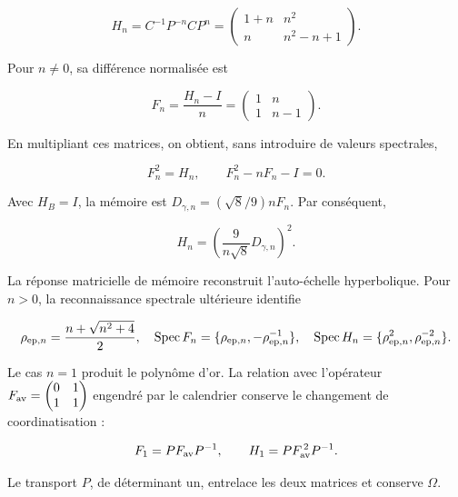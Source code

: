 \begin{equation}
H_n=C^{-1}P^{-n}CP^n
=\begin{pmatrix}1+n&n^2\\n&n^2-n+1\end{pmatrix}.
\label{md:antmem:matriz:eq:28}
\end{equation}

Pour \(n\ne0\), sa différence normalisée est

\[
F_n=\frac{H_n-I}{n}
=\begin{pmatrix}1&n\\1&n-1\end{pmatrix}.
\]

En multipliant ces matrices, on obtient, sans introduire de valeurs spectrales,

\begin{equation}
\boxed{F_n^2=H_n,\qquad F_n^2-nF_n-I=0.}
\label{md:antmem:matriz:eq:29}
\end{equation}

Avec \(H_B=I\), la mémoire est
\(D_{\gamma,n}=(\sqrt8/9)nF_n\).
Par conséquent,

\begin{equation}
\boxed{H_n=\left(\frac9{n\sqrt8}D_{\gamma,n}\right)^2.}
\label{md:antmem:matriz:eq:30}
\end{equation}

La réponse matricielle de mémoire reconstruit l’auto-échelle
hyperbolique. Pour \(n>0\), la reconnaissance spectrale ultérieure
identifie

\begin{equation}
\rho_{{\rm ep},n}=\frac{n+\sqrt{n^2+4}}2,\quad
\operatorname{Spec}F_n=\{\rho_{{\rm ep},n},-\rho_{{\rm ep},n}^{-1}\},\quad
\operatorname{Spec}H_n=\{\rho_{{\rm ep},n}^2,\rho_{{\rm ep},n}^{-2}\}.
\label{md:antmem:matriz:eq:31}
\end{equation}

Le cas \(n=1\) produit le polynôme d’or.
La relation avec l’opérateur
\(F_{\rm av}=
\begin{pmatrix}0&1\\1&1\end{pmatrix}\)
engendré par le calendrier conserve le changement
de coordinatisation :

\begin{equation}
F_1=PF_{\rm av}P^{-1},\qquad
H_1=PF_{\rm av}^{\,2}P^{-1}.
\label{md:antmem:matriz:eq:32}
\end{equation}

Le transport \(P\), de déterminant un, entrelace les deux
matrices et conserve \(\Omega\).

